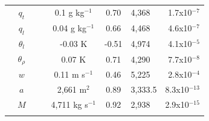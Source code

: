 \documentclass[acp]{copernicus}
\begin{document}
\begin{table}[t]
\begin{tabular}{lccccclr}
& $q_t$       & & &  0.1 g kg$^{-1}$           &  0.70 & 4,368   & 1.7x10$^{-7}$ \\
& $q_l$       & & &  0.04 g kg$^{-1}$          &  0.66 & 4,468   & 4.6x10$^{-7}$ \\
& $\theta_l$ & & & -0.03 K                    & -0.51 & 4,974   & 4.1x10$^{-5}$  \\
& $\theta_\rho$ & & &  0.07 K                &  0.71 & 4,290   & 7.7x10$^{-8}$ \\
& $w$         & & &  0.11 m s$^{-1}$           &  0.46 & 5,225   & 2.8x10$^{-4}$  \\
& $a$         & & &  2,661 m$^2$                &  0.89 & 3,333.5 & 8.3x10$^{-13}$ \\
& $M$         & & &  4,711 kg s$^{-1}$    &  0.92 & 2,938 & 2.9x10$^{-15}$ \\

\bottomhline
\end{tabular}
\end{table}





\end{document}
